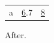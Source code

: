 \documentclass{article}
\begin{document}
\begin{tabular}{|l|c|r|}
a & \ul 6.7 & \ul 8 \\
\end{tabular}
After.
\end{document}

